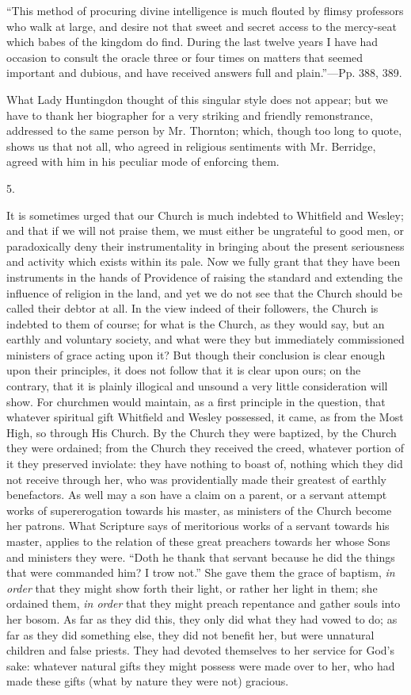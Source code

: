 ``This
method of procuring divine intelligence is much flouted by flimsy
professors who walk at large, and desire not that sweet and secret
access to the mercy-seat which babes of the kingdom do find. During
the last twelve years I have had occasion to consult the oracle three
or four times on matters that seemed important and dubious, and have
received answers full and plain.''—Pp. 388, 389.

What Lady Huntingdon thought of this singular
style does not appear; but we have to thank her biographer for a very
striking and friendly remonstrance, addressed to the same person by
Mr. Thornton; which, though too long to quote, shows us that not all,
who agreed in religious sentiments with Mr. Berridge, agreed with him
in his peculiar mode of enforcing them.

5.

It is sometimes urged that our Church is much
indebted to Whitfield and Wesley; and that if we will not praise them,
we must either be ungrateful to good men, or paradoxically deny their
instrumentality in bringing about the present seriousness and activity
which exists within its pale. Now we fully grant that they have been
instruments in the hands of Providence of raising the standard and
extending the influence of religion in the land, and yet we do not see
that the Church should be called their debtor at all. In the view
indeed of their followers, the Church is indebted to them of course;
for what is the Church, as they would say, but an earthly and
voluntary society, and what were they but immediately commissioned
ministers of grace acting upon it? But though their conclusion is
clear enough upon their principles, it does not follow that it is
clear upon ours; on the contrary, that it is plainly illogical and
unsound a very little consideration will show. For churchmen would
maintain, as a first principle in the question, that whatever
spiritual gift Whitfield and Wesley possessed, it came, as from the
Most High, so through His Church. By the Church they were baptized, by
the Church they were ordained; from the Church they received the
creed, whatever portion of it they preserved inviolate: they have
nothing to boast of, nothing which they did not receive through her,
who was providentially made their greatest of earthly benefactors. As
well may a son have a claim on a parent, or a servant attempt works of
supererogation towards his master, as ministers of the Church become
her patrons. What Scripture says of meritorious works of a servant
towards his master, applies to the relation of these great
preachers towards her whose Sons and ministers they were. ``Doth he
thank that servant because he did the things that were commanded him?
I trow not.'' She gave them the grace of baptism, \emph{in order} that
they might show forth their light, or rather her light in them; she
ordained them, \emph{in order} that they might preach repentance and
gather souls into her bosom. As far as they did this, they only did
what they had vowed to do; as far as they did something else, they did
not benefit her, but were unnatural children and false priests. They
had devoted themselves to her service for God's sake: whatever natural
gifts they might possess were made over to her, who had made these
gifts (what by nature they were not) gracious.

